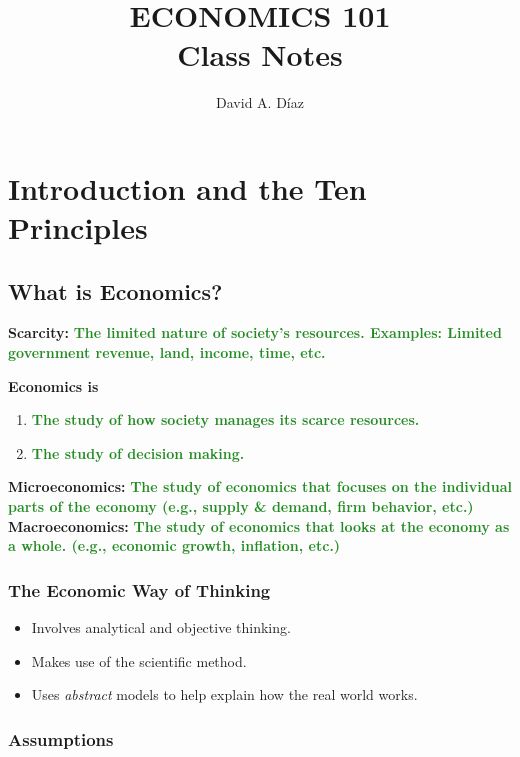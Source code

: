\documentclass[11pt]{article}\usepackage[]{graphicx}\usepackage[]{color}
\title{\textbf{ECONOMICS 101} \\ \vspace{2 mm} {\large \textbf{Class Notes}}}
\author{David A. D\'iaz}
\date{}
\theoremstyle{definition}
\newcommand{\ddp}[1]{{\textbf{\textcolor{ForestGreen}{#1}}}}
\newcommand{\defn}[1]{\textbf{#1}}
\begin{document}
\maketitle

\tableofcontents

\newpage
	
	\section{Introduction and the Ten Principles}
	
	\subsection{What is Economics?}
	
	\defn{Scarcity:} \ddp{The limited nature of society's resources. Examples: Limited government revenue, land, income, time, etc. \\}
	
	
	\defn{Economics is}
	\begin{enumerate}
		\setlength{\itemsep}{15pt}
		\item \ddp{The study of how society manages its scarce resources.}
		\item \ddp{The study of decision making.}
	\end{enumerate}
	\hspace{2cm}
	
	\defn{Microeconomics:} \ddp{The study of economics that focuses on the individual parts of the economy (e.g., supply \& demand, firm behavior, etc.)}
	\\
	
	\defn{Macroeconomics:}  \ddp{The study of economics that looks at the economy as a whole. (e.g., economic growth, inflation, etc.)}
	
	\subsubsection*{The Economic Way of Thinking}
	
	\begin{itemize}
		\item Involves analytical and objective thinking.
		\item Makes use of the scientific method.
		\item Uses \textit{abstract} models to help explain how the real world works.
	\end{itemize}
	
	\subsubsection*{Assumptions}
	
\end{document}
